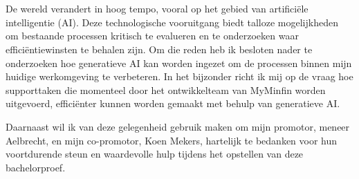 
\chapter*{}%
\label{ch:voorwoord}


De wereld verandert in hoog tempo, vooral op het gebied van artificiële intelligentie (AI). Deze technologische vooruitgang biedt talloze mogelijkheden om bestaande processen kritisch te evalueren en te onderzoeken waar efficiëntiewinsten te behalen zijn. Om die reden heb ik besloten nader te onderzoeken hoe generatieve AI kan worden ingezet om de processen binnen mijn huidige werkomgeving te verbeteren. In het bijzonder richt ik mij op de vraag hoe supporttaken die momenteel door het ontwikkelteam van MyMinfin worden uitgevoerd, efficiënter kunnen worden gemaakt met behulp van generatieve AI.


Daarnaast wil ik van deze gelegenheid gebruik maken om mijn promotor, meneer Aelbrecht, en mijn co-promotor, Koen Mekers, hartelijk te bedanken voor hun voortdurende steun en waardevolle hulp tijdens het opstellen van deze bachelorproef.